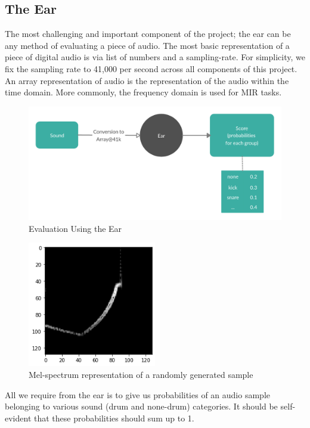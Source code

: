 \documentclass{nime-alternate} %
\begin{document}
\subsection{The Ear}
The most challenging and important component of the project; the ear can be any method of evaluating a piece of audio. The most basic representation of a piece of digital audio is via list of numbers and a sampling-rate. For simplicity, we fix the sampling rate to 41,000 per second across all components of this project. An array representation of audio is the representation of the audio within the time domain. More commonly, the frequency domain is used for MIR tasks.
\begin{figure}[H]
\centering
\includegraphics[width=\textwidth]{images/SSS_ear.png}
\caption{Evaluation Using the Ear}
\label{fig:SSS generator}
\end{figure}

\begin{figure}[h!]
\centering
\includegraphics[width=0.5\textwidth]{images/specplot.png}
\caption{Mel-spectrum representation of a randomly generated sample}
\label{fig:SSS generator}
\end{figure}
All we require from the ear is to give us probabilities of an audio sample belonging to various sound (drum and none-drum) categories. It should be self-evident that these probabilities should sum up to 1.\\
\end{document}
